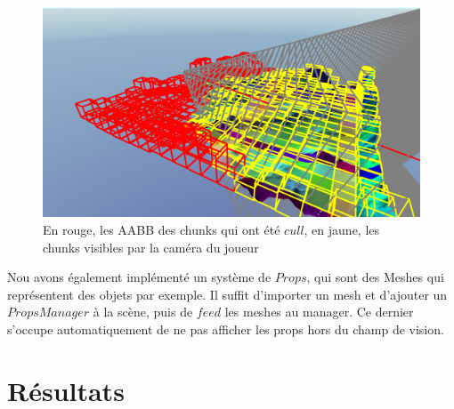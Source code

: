 \documentclass{EPUProjetDi}
\begin{document}
\begin{figure}[H]
	\centering
	\includegraphics[scale=.5]{frustum_culling}
	\caption{En rouge, les AABB des chunks qui ont été $cull$, en jaune, les chunks visibles par la caméra du joueur}
	\label{fig:frustum_culling}
\end{figure}

Nou avons également implémenté un système de $Props$, qui sont des Meshes qui représentent des objets par exemple.
Il suffit d'importer un mesh et d'ajouter un $PropsManager$ à la scène, puis de $feed$ les meshes au manager. 
Ce dernier s'occupe automatiquement de ne pas afficher les props hors du champ de vision.



\chapter{Résultats}
\end{document}
